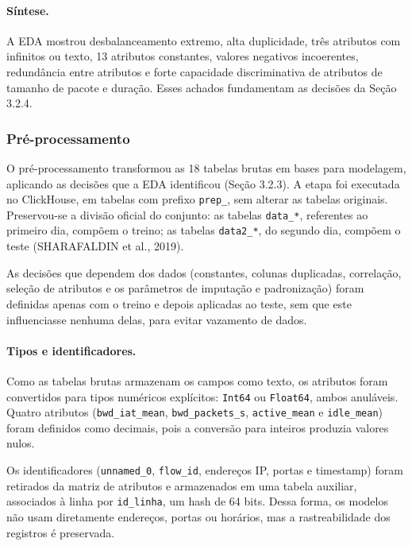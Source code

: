 \documentclass[
    12pt,                %
    openright,           %
    oneside,             %
    a4paper,             %
    english,             %
    brazil               %
]{abntex2}
\begin{document}
\paragraph{Síntese.}
A EDA mostrou desbalanceamento extremo, alta duplicidade, três atributos com infinitos ou texto, 13 atributos constantes, valores negativos incoerentes, redundância entre atributos e forte capacidade discriminativa de atributos de tamanho de pacote e duração. Esses achados fundamentam as decisões da Seção 3.2.4.

\subsubsection{Pré-processamento}

O pré-processamento transformou as 18 tabelas brutas em bases para modelagem, aplicando as decisões que a EDA identificou (Seção 3.2.3). A etapa foi executada no ClickHouse, em tabelas com prefixo \texttt{prep\_}, sem alterar as tabelas originais. Preservou-se a divisão oficial do conjunto: as tabelas \texttt{data\_*}, referentes ao primeiro dia, compõem o treino; as tabelas \texttt{data2\_*}, do segundo dia, compõem o teste (SHARAFALDIN et al., 2019).

As decisões que dependem dos dados (constantes, colunas duplicadas, correlação, seleção de atributos e os parâmetros de imputação e padronização) foram definidas apenas com o treino e depois aplicadas ao teste, sem que este influenciasse nenhuma delas, para evitar vazamento de dados.

\paragraph{Tipos e identificadores.}
Como as tabelas brutas armazenam os campos como texto, os atributos foram convertidos para tipos numéricos explícitos: \texttt{Int64} ou \texttt{Float64}, ambos anuláveis. Quatro atributos (\texttt{bwd\_iat\_mean}, \texttt{bwd\_packets\_s}, \texttt{active\_mean} e \texttt{idle\_mean}) foram definidos como decimais, pois a conversão para inteiros produzia valores nulos.

Os identificadores (\texttt{unnamed\_0}, \texttt{flow\_id}, endereços IP, portas e timestamp) foram retirados da matriz de atributos e armazenados em uma tabela auxiliar, associados à linha por \texttt{id\_linha}, um hash de 64 bits. Dessa forma, os modelos não usam diretamente endereços, portas ou horários, mas a rastreabilidade dos registros é preservada.
\end{document}
